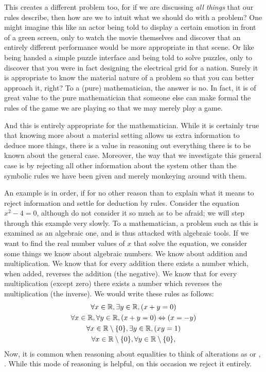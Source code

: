 \documentclass[11pt]{article}
\begin{document}
This creates a different problem too, for if we are discussing \emph{all things} that our rules describe, then how are we to intuit what we should do with a problem? One might imagine this like an actor being told to display a certain emotion in front of a green screen, only to watch the movie themselves and discover that an entirely different performance would be more appropriate in that scene. Or like being handed a simple puzzle interface and being told to solve puzzles, only to discover that you were in fact designing the electrical grid for a nation. Surely it is appropriate to know the material nature of a problem so that you can better approach it, right? To a (pure) mathematician, the answer is no. In fact, it is of great value to the pure mathematician that someone else can make formal the rules of the game we are playing so that we may merely play a game.

And this is entirely appropriate for the mathematician. While it is certainly true that knowing more about a material setting allows us extra information to deduce more things, there is a value in reasoning out everything there is to be known about the general case. Moreover, the way that we investigate this general case is by rejecting all other information about the system other than the symbolic rules we have been given and merely monkeying around with them.

An example is in order, if for no other reason than to explain what it means to reject information and settle for deduction by rules. Consider the equation $x^2 - 4 = 0$, although do not consider it so much as to be afraid; we will step through this example very slowly. To a mathematician, a problem such as this is examined as an algebraic one, and is thus attacked with algebraic tools. If we want to find the real number values of $x$ that solve the equation, we consider some things we know about algebraic numbers. We know about addition and multiplication. We know that for every addition there exists a number which, when added, reverses the addition (the negative). We know that for every multiplication (except zero) there exists a number which reverses the multiplication (the inverse). We would write these rules as follows: \begin{gather*}
\forall x \in \mathbb{R}, \exists y \in \mathbb{R}, (x + y = 0) \\
\forall x \in \mathbb{R}, \forall y \in \mathbb{R}, (x + y = 0) \Leftrightarrow (x = -y) \\
\forall x \in \mathbb{R} \setminus \{0\}, \exists y \in \mathbb{R}, (x y = 1) \\
\forall x \in \mathbb{R} \setminus \{0\}, \forall y \in \mathbb{R} \setminus \{0\}, 
\end{gather*}
Now, it is common when reasoning about equalities to think of alterations as  or , . While this mode of reasoning is helpful, on this occasion we reject it entirely.
\end{document}
